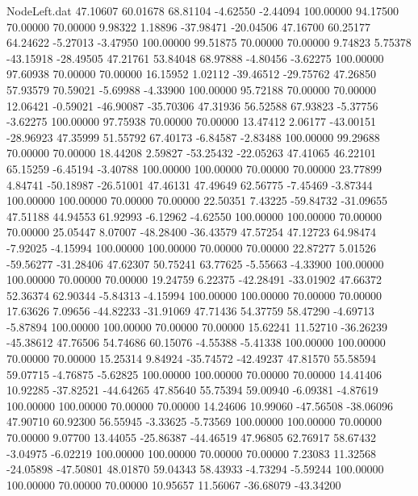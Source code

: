 \begin{filecontents}{NodeLeft.dat}
  47.10607   60.01678   68.81104    -4.62550   -2.44094  100.00000   94.17500   70.00000   70.00000    9.98322    1.18896  -37.98471  -20.04506
  47.16700   60.25177   64.24622    -5.27013   -3.47950  100.00000   99.51875   70.00000   70.00000    9.74823    5.75378  -43.15918  -28.49505
  47.21761   53.84048   68.97888    -4.80456   -3.62275  100.00000   97.60938   70.00000   70.00000   16.15952    1.02112  -39.46512  -29.75762
  47.26850   57.93579   70.59021    -5.69988   -4.33900  100.00000   95.72188   70.00000   70.00000   12.06421   -0.59021  -46.90087  -35.70306
  47.31936   56.52588   67.93823    -5.37756   -3.62275  100.00000   97.75938   70.00000   70.00000   13.47412    2.06177  -43.00151  -28.96923
  47.35999   51.55792   67.40173    -6.84587   -2.83488  100.00000   99.29688   70.00000   70.00000   18.44208    2.59827  -53.25432  -22.05263
  47.41065   46.22101   65.15259    -6.45194   -3.40788  100.00000  100.00000   70.00000   70.00000   23.77899    4.84741  -50.18987  -26.51001
  47.46131   47.49649   62.56775    -7.45469   -3.87344  100.00000  100.00000   70.00000   70.00000   22.50351    7.43225  -59.84732  -31.09655
  47.51188   44.94553   61.92993    -6.12962   -4.62550  100.00000  100.00000   70.00000   70.00000   25.05447    8.07007  -48.28400  -36.43579
  47.57254   47.12723   64.98474    -7.92025   -4.15994  100.00000  100.00000   70.00000   70.00000   22.87277    5.01526  -59.56277  -31.28406
  47.62307   50.75241   63.77625    -5.55663   -4.33900  100.00000  100.00000   70.00000   70.00000   19.24759    6.22375  -42.28491  -33.01902
  47.66372   52.36374   62.90344    -5.84313   -4.15994  100.00000  100.00000   70.00000   70.00000   17.63626    7.09656  -44.82233  -31.91069
  47.71436   54.37759   58.47290    -4.69713   -5.87894  100.00000  100.00000   70.00000   70.00000   15.62241   11.52710  -36.26239  -45.38612
  47.76506   54.74686   60.15076    -4.55388   -5.41338  100.00000  100.00000   70.00000   70.00000   15.25314    9.84924  -35.74572  -42.49237
  47.81570   55.58594   59.07715    -4.76875   -5.62825  100.00000  100.00000   70.00000   70.00000   14.41406   10.92285  -37.82521  -44.64265
  47.85640   55.75394   59.00940    -6.09381   -4.87619  100.00000  100.00000   70.00000   70.00000   14.24606   10.99060  -47.56508  -38.06096
  47.90710   60.92300   56.55945    -3.33625   -5.73569  100.00000  100.00000   70.00000   70.00000    9.07700   13.44055  -25.86387  -44.46519
  47.96805   62.76917   58.67432    -3.04975   -6.02219  100.00000  100.00000   70.00000   70.00000    7.23083   11.32568  -24.05898  -47.50801
  48.01870   59.04343   58.43933    -4.73294   -5.59244  100.00000  100.00000   70.00000   70.00000   10.95657   11.56067  -36.68079  -43.34200

\end{filecontents}
